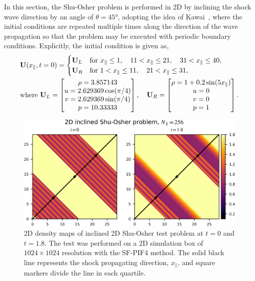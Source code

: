 In this section, the Shu-Osher problem is performed in 2D by inclining the shock wave direction
by an angle of \(\theta = \ang{45} \),
adopting the idea of Kawai~\cite{kawai2013divergence},
where the initial conditions are repeated multiple times along the direction of the
wave propagation so that the problem may be executed with periodic boundary conditions.
Explicitly, the initial condition is given as,
\begin{equation}\label{eq:shu45_gov}
    \begin{split}
        &\mathbf{U}(x_{\parallel}, t=0) = \begin{cases}
            \mathbf{U}_{L} & \text{for } x_{\parallel} \le 1, \quad 11 < x_{\parallel} \le 21, \quad 31 < x_{\parallel} \le 40, \\
            \mathbf{U}_{R} & \text{for } 1 < x_{\parallel} \le 11, \quad 21 < x_{\parallel} \le 31,
        \end{cases}\\
        &\text{where } \mathbf{U}_{L} = \begin{bmatrix}
            \rho = 3.857143 \\
            u = 2.629369\cos(\pi/4) \\
            v = 2.629369\sin(\pi/4) \\
            p = 10.33333
        \end{bmatrix},\quad
        \mathbf{U}_{R} = \begin{bmatrix}
            \rho = 1 + 0.2\sin(5 x_{\parallel}) \\
            u = 0 \\
            v = 0 \\
            p = 1
        \end{bmatrix}.
    \end{split}
\end{equation}

\begin{figure}
    \centering
    \includegraphics[width=\textwidth]{fig/shu45_2d_snapshot.png}
    \caption{2D density maps of inclined 2D Shu-Osher test problem
        at \( t=0 \) and \( t=1.8 \). The test was performed on a 2D simulation box
        of \(1024 \times 1024 \) resolution with the SF-PIF4 method.
        The solid black line represents the shock propagating direction, \( x_{\parallel} \),
        and square markers divide the line in each quartile.
    }\label{fig:shu45_cmap}
\end{figure}

